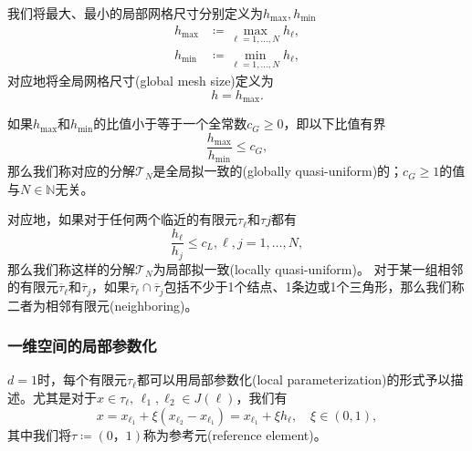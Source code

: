 我们将最大、最小的局部网格尺寸分别定义为$h_{\max},h_{\min}$
\begin{equation*}
  \begin{split}
    h_{\max} & \coloneqq \max_{\ell =1,\ldots,N} h_{\ell}, \\
    h_{\min} & \coloneqq \min_{\ell =1,\ldots,N} h_{\ell},
  \end{split}
\end{equation*}
对应地将全局网格尺寸(global mesh size)定义为
\begin{equation*}
  h = h_{\max}.
\end{equation*}

如果$h_{\max}$和$h_{\min}$的比值小于等于一个全常数$c_{G} \ge 0$，即以下比值有界
\begin{equation}
  \label{eq:finele-ref-quasi-uniform}
  \frac{h_{\max}}{h_{\min}} \le c_{G},
\end{equation}
那么我们称对应的分解$\mathcal{T}_{N}$是全局拟一致的(globally quasi-uniform)的；$c_{G} \ge 1$的值与$N \in \mathbb{N}$无关。

对应地，如果对于任何两个临近的有限元$\tau_{\ell}$和$\tau{j}$都有
\begin{equation*}
  \frac{h_{\ell}}{h_{j}} \le c_{L}, \ell,j = 1,\ldots,N,
\end{equation*}
那么我们称这样的分解$\mathcal{T}_{N}$为局部拟一致(locally quasi-uniform)。
对于某一组相邻的有限元$\overline{\tau}_{\ell}$和$\overline{\tau}_{j}$，如果$\overline{\tau}_{\ell} \cap \overline{\tau}_{j}$包括不少于1个结点、1条边或1个三角形，那么我们称二者为相邻有限元(neighboring)。

\subsubsection{一维空间的局部参数化}
$d=1$时，每个有限元$\tau_{\ell}$都可以用局部参数化(local parameterization)的形式予以描述。尤其是对于$x \in \tau_{\ell}, \, \ell_{1}, \ell_{2} \in J(\ell)$，我们有
\begin{equation*}
  x = x_{\ell_{1}} + \xi \left( x_{\ell_{2}} - x_{\ell_{1}} \right)
  =x_{\ell_{1}} + \xi h_{\ell}, \quad \xi \in (0,1),
\end{equation*}
其中我们将$\tau \coloneqq (0，1)$称为参考元(reference element)。


